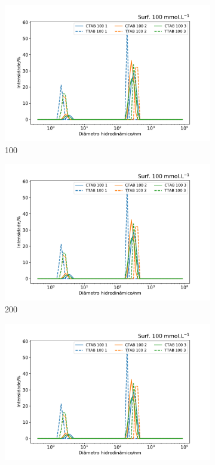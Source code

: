 \begin{figure}[h]
	\begin{subfigure}{0.3\textwidth}
		\centering
		\includegraphics[width=\textwidth]{imagens/dls/100_distrib}
		\caption{100\mM}
		\label{fig:DLS_100_distrib}
	\end{subfigure} %
	\begin{subfigure}{0.3\textwidth}
		\centering
		\includegraphics[width=\textwidth]{imagens/dls/200_distrib}
		\caption{200\mM}
		\label{fig:DLS_200_distrib}
		\end{subfigure} %
	\begin{subfigure}{0.3\textwidth}
		\centering
		\includegraphics[width=\textwidth]{imagens/dls/300_distrib}

\end{subfigure}
\end{figure}
